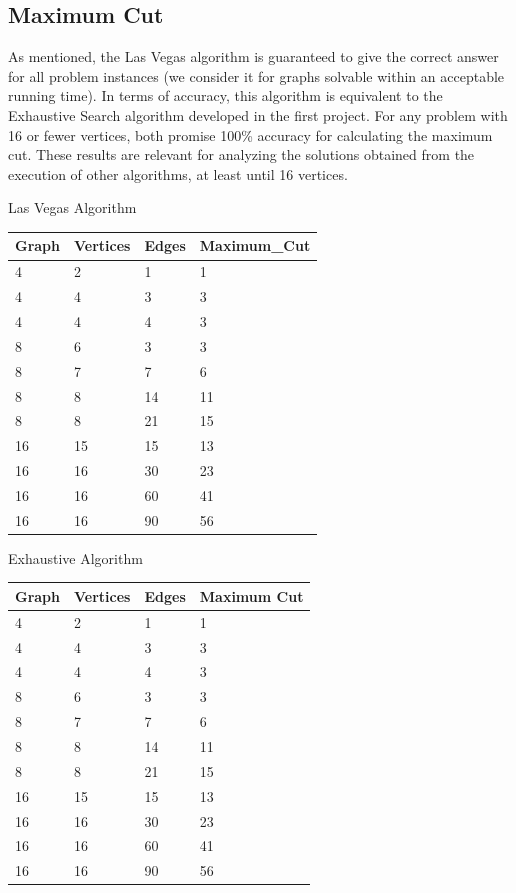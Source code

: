 \documentclass[]{revdetua}
\begin{document}
\subsection{Maximum Cut}

As mentioned, the Las Vegas algorithm is guaranteed to give the correct answer for all problem instances (we consider it for graphs solvable within an acceptable running time). In terms of accuracy, this algorithm is equivalent to the Exhaustive Search algorithm developed in the first project. For any problem with 16 or fewer vertices, both promise 100\% accuracy for calculating the maximum cut. These results are relevant for analyzing the solutions obtained from the execution of other algorithms, at least until 16 vertices. 

\begin{table}[!ht]
    \centering
    Las Vegas Algorithm
    \begin{tabular}{|l|l|l|l|}
    \hline
        Graph & Vertices & Edges & Maximum\_Cut \\ \hline
        4 & 2 & 1 & 1 \\ \hline
        4 & 4 & 3 & 3 \\ \hline
        4 & 4 & 4 & 3 \\ \hline
        8 & 6 & 3 & 3 \\ \hline
        8 & 7 & 7 & 6 \\ \hline
        8 & 8 & 14 & 11 \\ \hline
        8 & 8 & 21 & 15 \\ \hline
        16 & 15 & 15 & 13 \\ \hline
        16 & 16 & 30 & 23 \\ \hline
        16 & 16 & 60 & 41 \\ \hline
        16 & 16 & 90 & 56 \\ \hline
    \end{tabular}
\end{table}

\begin{table}[!ht]
    \centering
    Exhaustive Algorithm
    \begin{tabular}{|l|l|l|l|}
    \hline
        Graph         & Vertices      & Edges       & Maximum Cut      \\ \hline
        4 & 2 & 1 & 1 \\ \hline
        4 & 4 & 3 & 3 \\ \hline
        4 & 4 & 4 & 3 \\ \hline
        8 & 6 & 3 & 3 \\ \hline
        8 & 7 & 7 & 6 \\ \hline
        8 & 8 & 14 & 11 \\ \hline
        8 & 8 & 21 & 15 \\ \hline
        16 & 15 & 15 & 13 \\ \hline
        16 & 16 & 30 & 23 \\ \hline
        16 & 16 & 60 & 41 \\ \hline
        16 & 16 & 90 & 56 \\ \hline
    \end{tabular}
\end{table}
\end{document}
